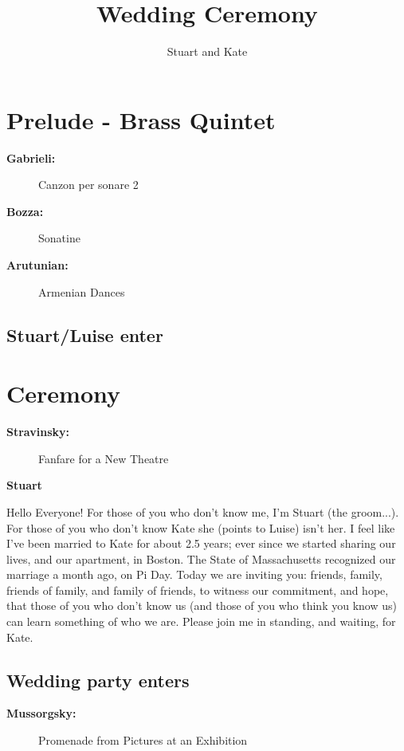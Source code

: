\documentclass[twoside]{article}
\author{Stuart and Kate}
\title{Wedding Ceremony}
\begin{document}
  \maketitle
  
  \section{Prelude - Brass Quintet}
    \begin{description}
      \item[\textbf{Gabrieli:}] Canzon per sonare 2
      \item[\textbf{Bozza:}] Sonatine
      \item[\textbf{Arutunian:}] Armenian Dances
    \end{description}
    \subsection{Stuart/Luise enter}
    
  \section{Ceremony}
    \begin{description}
      \item[\textbf{Stravinsky:}] Fanfare for a New Theatre
    \end{description}
  
  	\begin{center}
      \textbf{Stuart}
    \end{center}
Hello Everyone! For those of you who don’t know me, I’m Stuart (the groom...). For those of you who don’t know Kate she (points to Luise) isn’t her. I feel like I’ve been married to Kate for about 2.5 years; ever since we started sharing our lives, and our apartment, in Boston. The State of Massachusetts recognized our marriage a month ago, on Pi Day. Today we are inviting you: friends, family, friends of family, and family of friends, to witness our commitment, and hope, that those of you who don’t know us (and those of you who think you know us) can learn something of who we are. Please join me in standing, and waiting, for Kate.
		
    \subsection{Wedding party enters}
      \begin{description}
        \item[\textbf{Mussorgsky:}] Promenade from Pictures at an Exhibition
      \end{description}
  		
\end{document}
